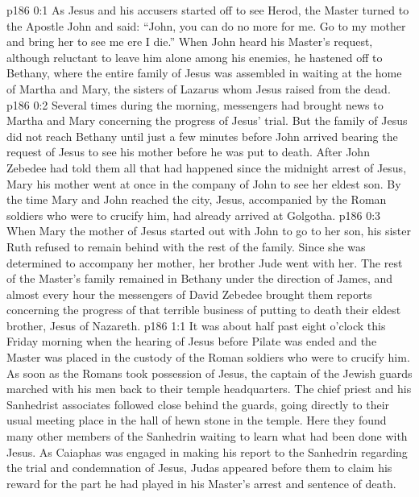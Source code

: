 \author{Midwayer Commission}
\vs p186 0:1 As Jesus and his accusers started off to see Herod, the Master turned to the Apostle John and said: \textcolor{ubdarkred}{“John, you can do no more for me. Go to my mother and bring her to see me ere I die.”} When John heard his Master’s request, although reluctant to leave him alone among his enemies, he hastened off to Bethany, where the entire family of Jesus was assembled in waiting at the home of Martha and Mary, the sisters of Lazarus whom Jesus raised from the dead.\plusone
\vs p186 0:2 Several times during the morning, messengers had brought news to Martha and Mary concerning the progress of Jesus’ trial. But the family of Jesus did not reach Bethany until just a few minutes before John arrived bearing the request of Jesus to see his mother before he was put to death. After John Zebedee had told them all that had happened since the midnight arrest of Jesus, Mary his mother went at once in the company of John to see her eldest son. By the time Mary and John reached the city, Jesus, accompanied by the Roman soldiers who were to crucify him, had already arrived at Golgotha.
\vs p186 0:3 When Mary the mother of Jesus started out with John to go to her son, his sister Ruth refused to remain behind with the rest of the family. Since she was determined to accompany her mother, her brother Jude went with her. The rest of the Master’s family remained in Bethany under the direction of James, and almost every hour the messengers of David Zebedee brought them reports concerning the progress of that terrible business of putting to death their eldest brother, Jesus of Nazareth.
\vs p186 1:1 It was about half past eight o’clock this Friday morning when the hearing of Jesus before Pilate was ended and the Master was placed in the custody of the Roman soldiers who were to crucify him. As soon as the Romans took possession of Jesus, the captain of the Jewish guards marched with his men back to their temple headquarters. The chief priest and his Sanhedrist associates followed close behind the guards, going directly to their usual meeting place in the hall of hewn stone in the temple. Here they found many other members of the Sanhedrin waiting to learn what had been done with Jesus. As Caiaphas was engaged in making his report to the Sanhedrin regarding the trial and condemnation of Jesus, Judas appeared before them to claim his reward for the part he had played in his Master’s arrest and sentence of death.
